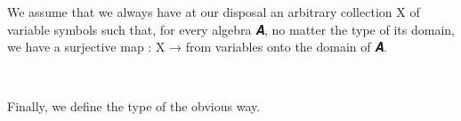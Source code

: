 \documentclass[a4paper,UKenglish,cleveref,autoref,thm-restate]{lipics-v2021}
\begin{document}
We assume that we always have at our disposal an arbitrary collection \ab X of variable symbols such that, for every algebra \ab 𝑨, no matter the type of its domain, we have a surjective map  \as : \ab X \as →  from variables onto the domain of \ab 𝑨.
\ccpad
\begin{code}%
\>[0][@{}l@{\AgdaIndent{1}}]%
\>[1]\AgdaSpace{}%
\AgdaSymbol{:}\AgdaSpace{}%
\AgdaSymbol{\{}\AgdaSpace{}%
\AgdaSpace{}%
\AgdaSymbol{:}\AgdaSpace{}%
\AgdaSymbol{\}}\AgdaSpace{}%
\AgdaSpace{}%
\AgdaSpace{}%
\AgdaSpace{}%
\AgdaSpace{}%
\AgdaSpace{}%
\AgdaSpace{}%
\AgdaSpace{}%
\AgdaSpace{}%
\AgdaSpace{}%
\AgdaSpace{}%
\AgdaSpace{}%
\<%
\\
%
\>[1]\AgdaSpace{}%
\AgdaSpace{}%
\AgdaSpace{}%
\AgdaSymbol{=}\AgdaSpace{}%
\AgdaSpace{}%
\AgdaSpace{}%
\AgdaSpace{}%
\AgdaSymbol{(}\AgdaSpace{}%
\AgdaSpace{}%
\AgdaSpace{}%
\AgdaSpace{}%
\AgdaSymbol{)}\AgdaSpace{}%
\AgdaFunction{,}\AgdaSpace{}%
\AgdaSpace{}%
\<%
\end{code}
\ccpad
Finally, we define the type of  the obvious way.
\ccpad
\end{document}
